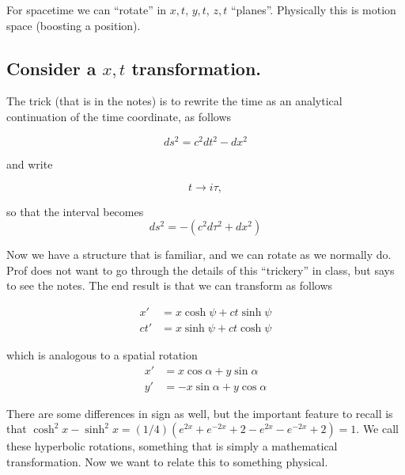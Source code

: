 For spacetime we can ``rotate'' in $x,t$, $y,t$, $z,t$ ``planes''.  Physically this is motion space (boosting a position).

\subsection{Consider a $x,t$ transformation.}

The trick (that is in the notes) is to rewrite the time as an analytical continuation of the time coordinate, as follows

\begin{equation}\label{eqn:relativisticElectrodynamicsL4:40}
ds^2 = c^2 dt^2 - dx^2
\end{equation}

and write

\begin{equation}\label{eqn:relativisticElectrodynamicsL4:50}
t \rightarrow i \tau,
\end{equation}

so that the interval becomes
\begin{equation}\label{eqn:relativisticElectrodynamicsL4:60}
ds^2 = - (c^2 d\tau^2 + dx^2)
\end{equation}

Now we have a structure that is familiar, and we can rotate as we normally do.  Prof does not want to go through the details of this ``trickery'' in class, but says to see the notes.  The end result is that we can transform as follows

\begin{align}\label{eqn:relativisticElectrodynamicsL4:70}
x' &= x \cosh \psi + ct \sinh \psi \\
ct' &= x \sinh \psi + ct \cosh \psi 
\end{align}

which is analogous to a spatial rotation
\begin{align}\label{eqn:relativisticElectrodynamicsL4:70b}
x' &= x \cos \alpha + y \sin \alpha \\
y' &= -x \sin \alpha + y \cos \alpha 
\end{align}


There are some differences in sign as well, but the important feature to recall is that $\cosh^2 x - \sinh^2 x = (1/4)( e^{2x} + e^{-2x} + 2 - e^{2x} - e^{-2x} + 2 ) = 1$.  We call these hyperbolic rotations, something that is simply a mathematical transformation.  Now we want to relate this to something physical.

